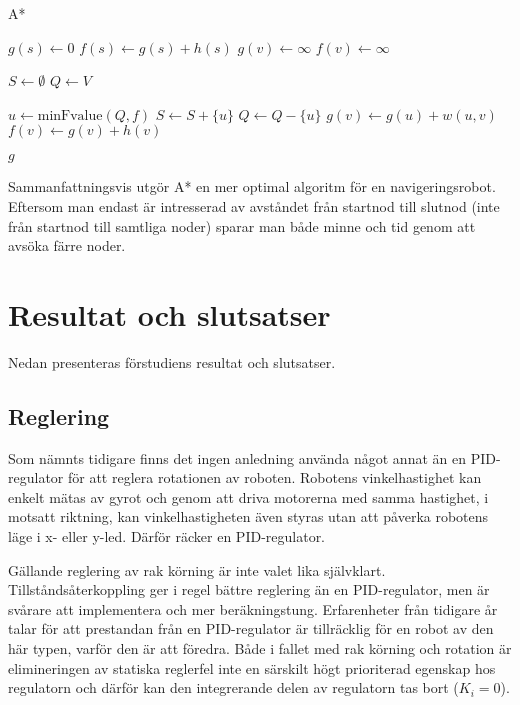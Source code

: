 \documentclass[11pt]{article}
\begin{document}
\begin{flushleft}
\begin{algorithm}[H]
	\caption{A*} \label{astar}
	\begin{algorithmic}[1]
			\State $g(s) \gets 0$
			\State $f(s) \gets g(s) + h(s)$
				\State $g(v) \gets \infty$
				\State $f(v) \gets \infty$
			\EndFor
			
			\State $S \gets \emptyset$
			\State $Q \gets V$
			
				\State $u \gets \textrm{minFvalue}(Q,f)$%
				\State $S \gets S +  \{ u\}$
				\State $Q \gets Q - \{ u\}$
						\State $g(v) \gets g(u) + w(u,v)$
						\State $f(v) \gets g(v) + h(v)$
					\EndIf
				\EndFor
			\EndWhile
			
			\Return $g$
		\EndFunction
	\end{algorithmic}
\end{algorithm}

Sammanfattningsvis utgör A* en mer optimal algoritm för en navigeringsrobot. Eftersom man endast är intresserad av avståndet från startnod till slutnod (inte från startnod till samtliga noder) sparar man både minne och tid genom att avsöka färre noder. 

\pagebreak
\section{Resultat och slutsatser}
Nedan presenteras förstudiens resultat och slutsatser.
\subsection{Reglering}
Som nämnts tidigare finns det ingen anledning använda något annat än en PID-regulator för att reglera rotationen av roboten. Robotens vinkelhastighet kan enkelt mätas av gyrot och genom att driva motorerna med samma hastighet, i motsatt riktning, kan vinkelhastigheten även styras utan att påverka robotens läge i x- eller y-led. Därför räcker en PID-regulator.

Gällande reglering av rak körning är inte valet lika självklart. Tillståndsåterkoppling ger i regel bättre reglering än en PID-regulator, men är svårare att implementera och mer beräkningstung. Erfarenheter från tidigare år talar för att prestandan från en PID-regulator är tillräcklig för en robot av den här typen, varför den är att föredra. Både i fallet med rak körning och rotation är elimineringen av statiska reglerfel inte en särskilt högt prioriterad egenskap hos regulatorn och därför kan den integrerande delen av regulatorn tas bort ($K_i = 0$).


\end{flushleft}
\end{document}
